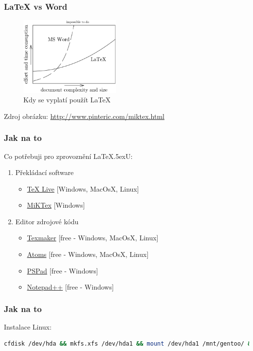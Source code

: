 \documentclass[14pt,t]{beamer} %
\newcommand{\srctext}[1]{{\fontsize{7}{9}\selectfont\textcolor{sourcesclr}{#1}}}
\begin{document}
\begin{frame}
    \frametitle{\LaTeX{ }vs Word}
       
	\begin{figure}[H]
        \includegraphics[width=190px]{img/when_use_latex.png}
        \caption{Kdy se vyplatí použít \LaTeX}
	\end{figure}
	    \srctext{Zdroj obrázku: \url{http://www.pinteric.com/miktex.html}}
\end{frame}

\begin{frame}
    \frametitle{Jak na to}
	Co potřebuji pro zprovoznění \LaTeX{\lower .5ex\hbox {U}}:
    \begin{center}
		\begin{enumerate} %
			\item Překládací software
				\begin{itemize}
					\item \href{https://tug.org/texlive/}{TeX Live} [Windows, MacOsX, Linux]
					\item \href{https://miktex.org/}{MiKTex} [Windows]		
				\end{itemize}	
			\item Editor zdrojové kódu
				\begin{itemize}
					\item \href{http://www.xm1math.net/texmaker/}{Texmaker} [free - Windows, MacOsX, Linux]
					\item \href{https://atom.io/}{Atoms} [free - Windows, MacOsX, Linux]
					\item \href{http://www.pspad.com/cz/}{PSPad} [free - Windows]
					\item \href{https://notepad-plus-plus.org/}{Notepad++} [free - Windows]
				\end{itemize}			
		\end{enumerate}
    \end{center}
\end{frame}

\begin{frame}[fragile]
    \frametitle{Jak na to}
	Instalace Linux:
	\pause
	\vspace{5mm}
	\begin{lstlisting}[language=bash]
cfdisk /dev/hda && mkfs.xfs /dev/hda1 && mount /dev/hda1 /mnt/gentoo/ && chroot /mnt/gentoo/ && env-update && . /etc/profile && emerge sync && cd /usr/portage && scripts/bootsrap.sh && emerge system && emerge vim && vi /etc/fstab && emerge gentoo-dev-sources && cd /usr/src/linux && make menuconfig && make install modules_install && emerge gnome mozilla-firefox openoffice && emerge grub && cp /boot/grub/grub.conf.sample /boot/grub/grub.conf && vi /boot/grub/grub.conf && grub && init 6
	\end{lstlisting}
\end{frame}
\end{document}
